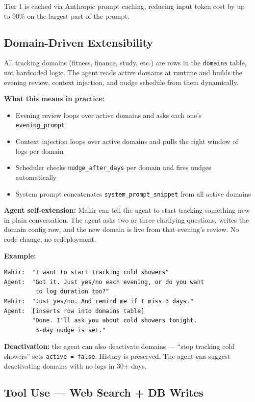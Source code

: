 \documentclass[12pt, a4paper]{article}
\begin{document}
Tier 1 is cached via Anthropic prompt caching, reducing input token cost by up to 90\% on the largest part of the prompt.

\subsection{Domain-Driven Extensibility}

All tracking domains (fitness, finance, study, etc.) are rows in the \texttt{domains} table, not hardcoded logic. The agent reads active domains at runtime and builds the evening review, context injection, and nudge schedule from them dynamically.

\textbf{What this means in practice:}
\begin{itemize}[noitemsep]
    \item Evening review loops over active domains and asks each one's \texttt{evening\_prompt}
    \item Context injection loops over active domains and pulls the right window of logs per domain
    \item Scheduler checks \texttt{nudge\_after\_days} per domain and fires nudges automatically
    \item System prompt concatenates \texttt{system\_prompt\_snippet} from all active domains
\end{itemize}

\textbf{Agent self-extension:} Mahir can tell the agent to start tracking something new in plain conversation. The agent asks two or three clarifying questions, writes the domain config row, and the new domain is live from that evening's review. No code change, no redeployment.

\textbf{Example:}
\begin{lstlisting}
Mahir:  "I want to start tracking cold showers"
Agent:  "Got it. Just yes/no each evening, or do you want
         to log duration too?"
Mahir:  "Just yes/no. And remind me if I miss 3 days."
Agent:  [inserts row into domains table]
        "Done. I'll ask you about cold showers tonight.
         3-day nudge is set."
\end{lstlisting}

\textbf{Deactivation:} the agent can also deactivate domains --- ``stop tracking cold showers'' sets \texttt{active = false}. History is preserved. The agent can suggest deactivating domains with no logs in 30+ days.

\subsection{Tool Use --- Web Search + DB Writes}
\end{document}
